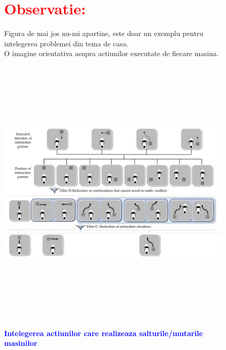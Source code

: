 \documentclass{article}
\begin{document}
\begin{figure}
\sffamily
\section*{\textcolor{red}{\bfseries{Observatie}:}}
\centering
\quad Figura de mai jos nu-mi apartine, este doar un exemplu pentru intelegerea problemei din tema de casa. \\ O imagine orientativa asupra actiunilor executate de fiecare masina.\par
\vspace{10mm}
\includegraphics[width=14cm, height=13cm]{parking.jpg}
\bfseries\caption{\textbf{\textcolor{blue}{Intelegerea actiunilor care realizeaza salturile/mutarile masinilor}}}
\end{figure}

\vspace{3mm}
\end{document}
